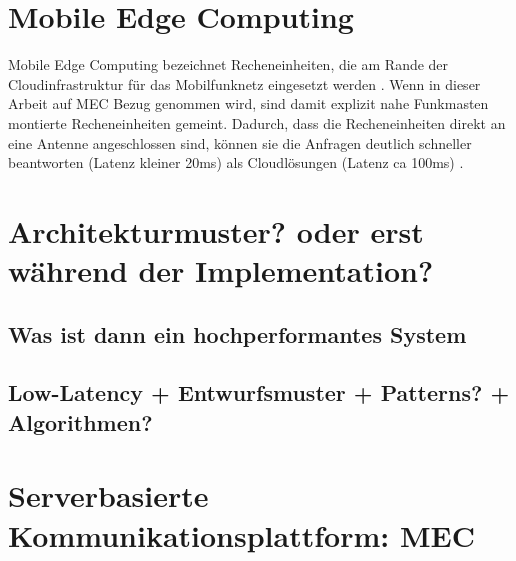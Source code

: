 \section{Mobile Edge Computing}

Mobile Edge Computing bezeichnet Recheneinheiten, die am Rande der Cloudinfrastruktur für das Mobilfunknetz eingesetzt werden \cite[4]{etsi:mec}.
Wenn in dieser Arbeit auf MEC Bezug genommen wird, sind damit explizit nahe Funkmasten montierte Recheneinheiten gemeint.
Dadurch, dass die Recheneinheiten direkt an eine Antenne angeschlossen sind, können sie die Anfragen deutlich schneller beantworten (Latenz kleiner 20ms) als Cloudlösungen (Latenz ca 100ms) \cite[2]{perf:mec:fraunhofer}.



\section{Architekturmuster? oder erst während der Implementation?}



			
			
		\subsection{Was ist dann ein hochperformantes System}
		\subsection{Low-Latency + Entwurfsmuster + Patterns? + Algorithmen?}
			
			
			
			
			
	\section{Serverbasierte Kommunikationsplattform: MEC}
	
		
		
